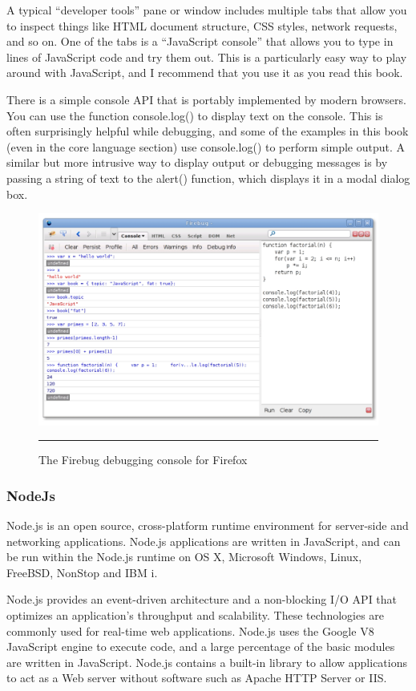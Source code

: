 A typical “developer tools” pane or window includes multiple tabs that allow you to
inspect things like HTML document structure, CSS styles, network requests, and so
on. One of the tabs is a “JavaScript console” that allows you to type in lines of JavaScript
code and try them out. This is a particularly easy way to play around with JavaScript,
and I recommend that you use it as you read this book.

There is a simple console API that is portably implemented by modern browsers. You
can use the function console.log() to display text on the console. This is often surprisingly
helpful while debugging, and some of the examples in this book (even in the
core language section) use console.log() to perform simple output. A similar but more
intrusive way to display output or debugging messages is by passing a string of text to
the alert() function, which displays it in a modal dialog box.
\begin{figure}[h!]
  \centering
    \includegraphics[width=\textwidth]{./Pictures/firebug.jpg}
  \rule{1\textwidth}{1pt}
 \caption{The Firebug debugging console for Firefox}
 \label{fig:Firebug}
\end{figure}


\subsubsection{NodeJs}
Node.js is an open source, cross-platform runtime environment for server-side and networking applications. Node.js applications are written in JavaScript, and can be run within the Node.js runtime on OS X, Microsoft Windows, Linux, FreeBSD, NonStop and IBM i.

Node.js provides an event-driven architecture and a non-blocking I/O API that optimizes an application's throughput and scalability. These technologies are commonly used for real-time web applications.
Node.js uses the Google V8 JavaScript engine to execute code, and a large percentage of the basic modules are written in JavaScript. Node.js contains a built-in library to allow applications to act as a Web server without software such as Apache HTTP Server or IIS.
